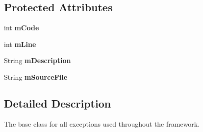 \subsection*{\-Protected \-Attributes}
\begin{DoxyCompactItemize}
\item 
\hypertarget{class_verdi_1_1_exception_a97b9919fe0a61ab7ff0770ca5dd81662}{int {\bfseries m\-Code}}\label{class_verdi_1_1_exception_a97b9919fe0a61ab7ff0770ca5dd81662}

\item 
\hypertarget{class_verdi_1_1_exception_ae9b47c5d53ee036e5647131446bd4f3c}{int {\bfseries m\-Line}}\label{class_verdi_1_1_exception_ae9b47c5d53ee036e5647131446bd4f3c}

\item 
\hypertarget{class_verdi_1_1_exception_a68890cb1a63e85d03f6ef17176b0b7fa}{\-String {\bfseries m\-Description}}\label{class_verdi_1_1_exception_a68890cb1a63e85d03f6ef17176b0b7fa}

\item 
\hypertarget{class_verdi_1_1_exception_a1e7e56c755606ffbc8efb6e82b91001a}{\-String {\bfseries m\-Source\-File}}\label{class_verdi_1_1_exception_a1e7e56c755606ffbc8efb6e82b91001a}

\end{DoxyCompactItemize}


\subsection{\-Detailed \-Description}
\-The base class for all exceptions used throughout the framework. 

